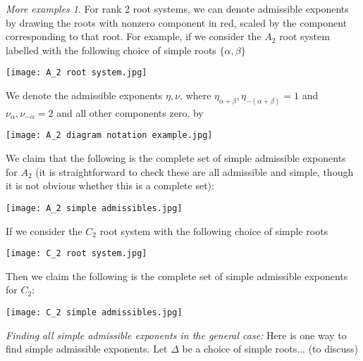 \documentclass[12pt]{amsart}
\theoremstyle{remark}
\theoremstyle{remark}
\theoremstyle{remark}
\newtheorem*{moreexamples}{More examples}
\begin{document}
\begin{moreexamples}
For rank 2 root systems, we can denote admissible exponents by drawing the roots with nonzero component in red, scaled by the component corresponding to that root.
For example, if we consider the $A_2$ root system labelled with the following choice of simple roots $\{\alpha, \beta\}$

\centerline{\texttt{[image: A\_2 root system.jpg]}}

\noindent
We denote the admissible exponents $\eta, \nu$, where $\eta_{\alpha+\beta}, \eta_{-(\alpha+\beta)}=1$ and $\nu_{\alpha}, \nu_{-\alpha}=2$ and all other components zero, by

\centerline{\texttt{[image: A\_2 diagram notation example.jpg]}}

\noindent
We claim that the following is the complete set of simple admissible exponents for $A_2$ (it is straightforward to check these are all admissible and simple, though it is not obvious whether this is a complete set):

\centerline{\texttt{[image: A\_2 simple admissibles.jpg]}}

\noindent
If we consider the $C_2$ root system with the following choice of simple roots

\centerline{\texttt{[image: C\_2 root system.jpg]}}

\noindent
Then we claim the following is the complete set of simple admissible exponents for $C_2$:

\centerline{\texttt{[image: C\_2 simple admissibles.jpg]}}

\end{moreexamples}

\emph{Finding all simple admissible exponents in the general case:}
Here is one way to find simple admissible exponents.
Let $\Delta$ be a choice of simple roots... (to discuss)


\begin{bibdiv}
\begin{biblist}


\end{biblist}
\end{bibdiv}
\end{document}
